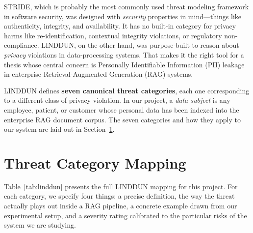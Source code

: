 \documentclass[12pt, a4paper]{report}
\begin{document}
STRIDE, which is probably the most commonly used threat modeling framework
in software security, was designed with \emph{security} properties in
mind---things like authenticity, integrity, and availability. It has no
built-in category for privacy harms like re-identification, contextual
integrity violations, or regulatory non-compliance.
LINDDUN, on the other hand, was purpose-built to reason about
\emph{privacy} violations in data-processing systems. That makes it the
right tool for a thesis whose central concern is Personally Identifiable
Information (PII) leakage in enterprise Retrieval-Augmented Generation
(RAG) systems.

LINDDUN defines \textbf{seven canonical threat categories}, each one
corresponding to a different class of privacy violation. In our project,
a \emph{data subject} is any employee, patient, or customer whose
personal data has been indexed into the enterprise RAG document corpus.
The seven categories and how they apply to our system are laid out in
Section~\ref{sec:linddun-table}.

\section{Threat Category Mapping}
\label{sec:linddun-table}

Table~\ref{tab:linddun} presents the full LINDDUN mapping for this project.
For each category, we specify four things: a precise definition, the way
the threat actually plays out inside a RAG pipeline, a concrete example
drawn from our experimental setup, and a severity rating calibrated to the
particular risks of the system we are studying.

\vspace{0.4cm}
\end{document}
